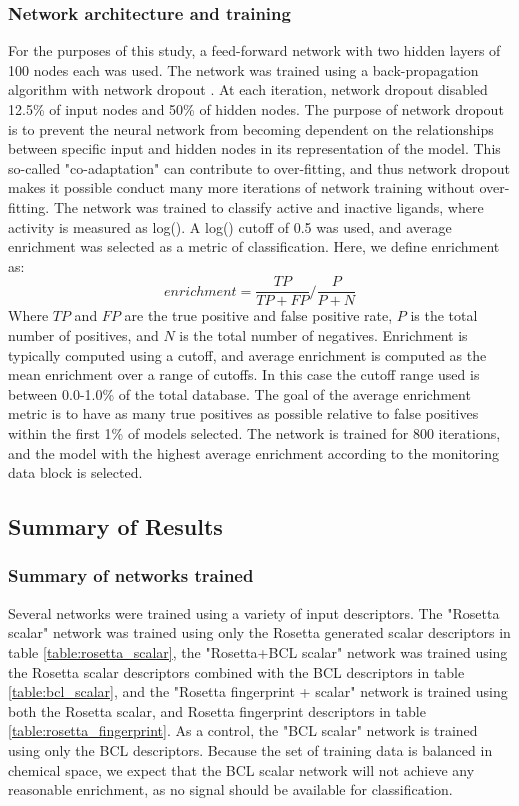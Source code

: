 \subsubsection{Network architecture and training}

For the purposes of this study, a feed-forward network with two hidden layers of 100 nodes each was used.
The network was trained using a back-propagation algorithm with network dropout \citep{Hinton:2012tv}.
At each iteration, network dropout disabled 12.5\% of input nodes and 50\% of hidden nodes.
The purpose of network dropout is to prevent the neural network from becoming dependent on the relationships between specific input and hidden nodes in its representation of the model.
This so-called "co-adaptation" can contribute to over-fitting, and thus network dropout makes it possible conduct many more iterations of network training without over-fitting.
The network was trained to classify active and inactive ligands, where activity is measured as log(\ki).
A log(\ki) cutoff of 0.5 was used, and average enrichment was selected as a metric of classification.
Here, we define enrichment as:
\begin{equation}
\label{eq:enrichment}
enrichment = \frac{TP}{TP+FP}/\frac{P}{P+N}
\end{equation}
Where $TP$ and $FP$ are the true positive and false positive rate, $P$ is the total number of positives, and $N$ is the total number of negatives.
Enrichment is typically computed using a cutoff, and average enrichment is computed as the mean enrichment over a range of cutoffs.  In this case the cutoff range used is between 0.0-1.0\% of the total database.
The goal of the average enrichment metric is to have as many true positives as possible relative to false positives within the first 1\% of models selected.
The network is trained for 800 iterations, and the model with the highest average enrichment according to the monitoring data block is selected.

\subsection{Summary of Results}

\subsubsection{Summary of networks trained}
\label{subsubsec:network_training}
Several networks were trained using a variety of input descriptors.
The "Rosetta scalar" network was trained using only the Rosetta generated scalar descriptors in table \ref{table:rosetta_scalar}, the "Rosetta+BCL scalar" network was trained using the Rosetta scalar descriptors combined with the \ac{BCL} descriptors in table \ref{table:bcl_scalar}, and the "Rosetta fingerprint + scalar" network is trained using both the Rosetta scalar, and Rosetta fingerprint descriptors in table \ref{table:rosetta_fingerprint}.
As a control, the "\ac{BCL} scalar" network is trained using only the \ac{BCL} descriptors.
Because the set of training data is balanced in chemical space, we expect that the \ac{BCL} scalar network will not achieve any reasonable enrichment, as no signal should be available for classification.


